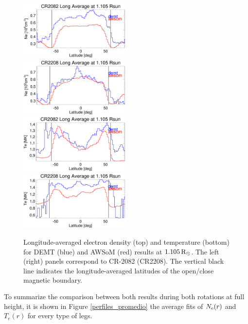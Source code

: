 \documentclass[namedreferences]{solarphysics}
\newcommand{\mrsun}{{\rm R_\odot}}
\newcommand{\Ne}{N_{\rm e}}
\begin{document}
\begin{article}
\begin{figure}[h!]
\begin{center}
\includegraphics[width=0.495\textwidth]{figs/Perfil_Ne_demt_awsom_2082_1105.eps}
\includegraphics[width=0.495\textwidth]{figs/Perfil_Ne_demt_awsom_2208_1105.eps}
\includegraphics[width=0.495\textwidth]{figs/Perfil_Te_demt_awsom_2082_1105.eps}
\includegraphics[width=0.495\textwidth]{figs/Perfil_Te_demt_awsom_2208_1105.eps}
\caption{Longitude-averaged electron density (top) and temperature (bottom) for DEMT (blue) and AWSoM (red) results at $1.105\,\mrsun$. The left (right) panels correspond to CR-2082 (CR2208). The vertical black line indicates the longitude-averaged latitudes of the open/close magnetic boundary.}
\label{perf_lat}
\end{center}
\end{figure}

To summarize the comparison between both results during both rotations at full height, it is shown in Figure \ref{perfiles_promedio} the average fits of $\Ne(r)$ and $T_e(r)$ for every type of legs.


\end{article}
\end{document}
